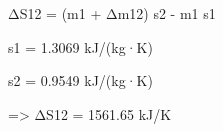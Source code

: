 ΔS12 = (m1 + Δm12) s2 - m1 s1  

s1 = 1.3069 kJ/(kg·K)  

s2 = 0.9549 kJ/(kg·K)  

=> ΔS12 = 1561.65 kJ/K
